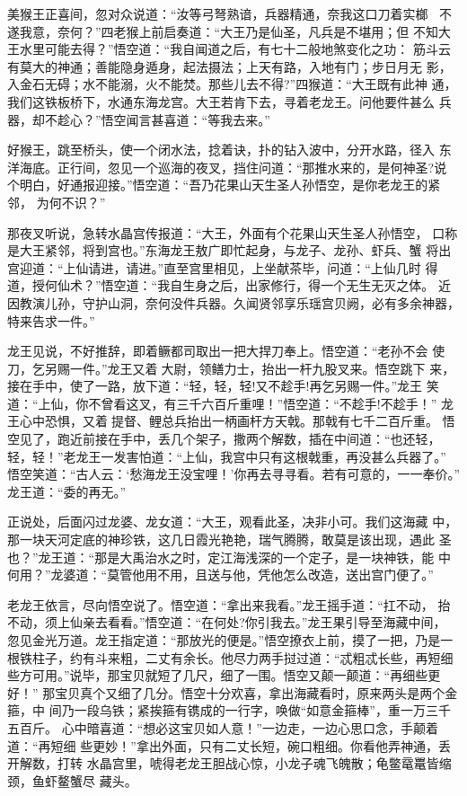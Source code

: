 美猴王正喜间，忽对众说道：“汝等弓弩熟谙，兵器精通，奈我这口刀着实榔
，不遂我意，奈何？”四老猴上前启奏道：“大王乃是仙圣，凡兵是不堪用；但
不知大王水里可能去得？”悟空道：“我自闻道之后，有七十二般地煞变化之功：
筋斗云有莫大的神通；善能隐身遁身，起法摄法；上天有路，入地有门；步日月无
影，入金石无碍；水不能溺，火不能焚。那些儿去不得?”四猴道：“大王既有此神
通，我们这铁板桥下，水通东海龙宫。大王若肯下去，寻着老龙王。问他要件甚么
兵器，却不趁心？”悟空闻言甚喜道：“等我去来。”

好猴王，跳至桥头，使一个闭水法，捻着诀，扑的钻入波中，分开水路，径入
东洋海底。正行间，忽见一个巡海的夜叉，挡住问道：“那推水来的，是何神圣?说
个明白，好通报迎接。”悟空道：“吾乃花果山天生圣人孙悟空，是你老龙王的紧邻，
为何不识？”

那夜叉听说，急转水晶宫传报道：“大王，外面有个花果山天生圣人孙悟空，
口称是大王紧邻，将到宫也。”东海龙王敖广即忙起身，与龙子、龙孙、虾兵、蟹
将出宫迎道：“上仙请进，请进。”直至宫里相见，上坐献茶毕，问道：“上仙几时
得道，授何仙术？”悟空道：“我自生身之后，出家修行，得一个无生无灭之体。
近因教演儿孙，守护山洞，奈何没件兵器。久闻贤邻享乐瑶宫贝阙，必有多余神器，
特来告求一件。”

龙王见说，不好推辞，即着鳜都司取出一把大捍刀奉上。悟空道：“老孙不会
使刀，乞另赐一件。”龙王又着大尉，领鳝力士，抬出一杆九股叉来。悟空跳下
来，接在手中，使了一路，放下道：“轻，轻，轻!又不趁手!再乞另赐一件。”龙王
笑道：“上仙，你不曾看这叉，有三千六百斤重哩！”悟空道：“不趁手!不趁手！”
龙王心中恐惧，又着提督、鲤总兵抬出一柄画杆方天戟。那戟有七千二百斤重。
悟空见了，跑近前接在手中，丢几个架子，撒两个解数，插在中间道：“也还轻，
轻，轻！”老龙王一发害怕道：“上仙，我宫中只有这根戟重，再没甚么兵器了。”
悟空笑道：“古人云：‘愁海龙王没宝哩！’你再去寻寻看。若有可意的，一一奉价。”
龙王道：“委的再无。”

正说处，后面闪过龙婆、龙女道：“大王，观看此圣，决非小可。我们这海藏
中，那一块天河定底的神珍铁，这几日霞光艳艳，瑞气腾腾，敢莫是该出现，遇此
圣也？”龙王道：“那是大禹治水之时，定江海浅深的一个定子，是一块神铁，能
中何用？”龙婆道：“莫管他用不用，且送与他，凭他怎么改造，送出宫门便了。”

老龙王依言，尽向悟空说了。悟空道：“拿出来我看。”龙王摇手道：“扛不动，
抬不动，须上仙亲去看看。”悟空道：“在何处?你引我去。”龙王果引导至海藏中间，
忽见金光万道。龙王指定道：“那放光的便是。”悟空撩衣上前，摸了一把，乃是一
根铁柱子，约有斗来粗，二丈有余长。他尽力两手挝过道：“忒粗忒长些，再短细
些方可用。”说毕，那宝贝就短了几尺，细了一围。悟空又颠一颠道：“再细些更好！”
那宝贝真个又细了几分。悟空十分欢喜，拿出海藏看时，原来两头是两个金箍，中
间乃一段乌铁；紧挨箍有镌成的一行字，唤做“如意金箍棒”，重一万三千五百斤。
心中暗喜道：“想必这宝贝如人意！”一边走，一边心思口念，手颠着道：“再短细
些更妙！”拿出外面，只有二丈长短，碗口粗细。你看他弄神通，丢开解数，打转
水晶宫里，唬得老龙王胆战心惊，小龙子魂飞魄散；龟鳖鼋鼍皆缩颈，鱼虾鳌蟹尽
藏头。

